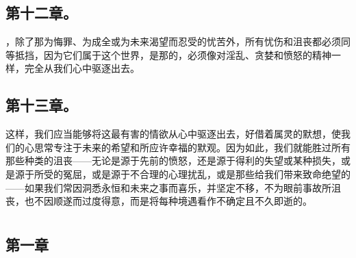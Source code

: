 
\subsection{第十二章。}

\par

，除了那为悔罪、为成全或为未来渴望而忍受的忧苦外，所有忧伤和沮丧都必须同等抵挡，因为它们属于这个世界，是那的，必须像对淫乱、贪婪和愤怒的精神一样，完全从我们心中驱逐出去。\par


\subsection{第十三章。}

\par

这样，我们应当能够将这最有害的情欲从心中驱逐出去，好借着属灵的默想，使我们的心思常专注于未来的希望和所应许幸福的默观。因为如此，我们就能胜过所有那些种类的沮丧——无论是源于先前的愤怒，还是源于得利的失望或某种损失，或是源于所受的冤屈，或是源于不合理的心理扰乱，或是那些给我们带来致命绝望的——如果我们常因洞悉永恒和未来之事而喜乐，并坚定不移，不为眼前事故所沮丧，也不因顺遂而过度得意，而是将每种境遇看作不确定且不久即逝的。\par



\section{}


\subsection{第一章}

